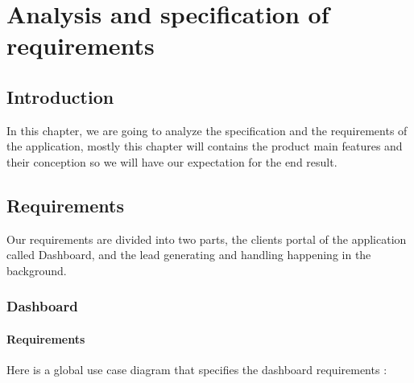 \chapter{Analysis and specification of requirements}
\newpage

\setcounter{secnumdepth}{0} %
\section{Introduction}
In this chapter, we are going to analyze the specification and the requirements of the application, mostly this chapter will contains the product main features and their conception so we will have our expectation for the end result.
\setcounter{secnumdepth}{3} %

\section{Requirements}
Our requirements are divided into two parts, the clients portal of the application called Dashboard, and the lead generating and handling happening in the background.
\subsection{Dashboard}
\subsubsection{Requirements}
Here is a global use case diagram that specifies the dashboard requirements :
\newpage
